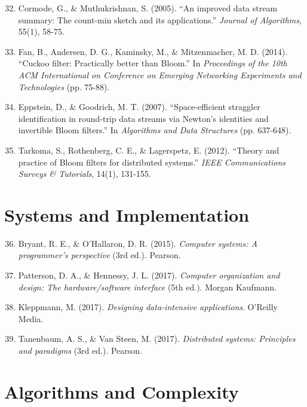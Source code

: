 \begin{enumerate}
\setcounter{enumi}{31}
\item Cormode, G., \& Muthukrishnan, S. (2005). ``An improved data stream summary: The count-min sketch and its applications.'' \textit{Journal of Algorithms}, 55(1), 58-75.

\item Fan, B., Andersen, D. G., Kaminsky, M., \& Mitzenmacher, M. D. (2014). ``Cuckoo filter: Practically better than Bloom.'' In \textit{Proceedings of the 10th ACM International on Conference on Emerging Networking Experiments and Technologies} (pp. 75-88).

\item Eppstein, D., \& Goodrich, M. T. (2007). ``Space-efficient straggler identification in round-trip data streams via Newton's identities and invertible Bloom filters.'' In \textit{Algorithms and Data Structures} (pp. 637-648).

\item Tarkoma, S., Rothenberg, C. E., \& Lagerspetz, E. (2012). ``Theory and practice of Bloom filters for distributed systems.'' \textit{IEEE Communications Surveys \& Tutorials}, 14(1), 131-155.
\end{enumerate}

\section*{Systems and Implementation}

\begin{enumerate}
\setcounter{enumi}{35}
\item Bryant, R. E., \& O'Hallaron, D. R. (2015). \textit{Computer systems: A programmer's perspective} (3rd ed.). Pearson.

\item Patterson, D. A., \& Hennessy, J. L. (2017). \textit{Computer organization and design: The hardware/software interface} (5th ed.). Morgan Kaufmann.

\item Kleppmann, M. (2017). \textit{Designing data-intensive applications}. O'Reilly Media.

\item Tanenbaum, A. S., \& Van Steen, M. (2017). \textit{Distributed systems: Principles and paradigms} (3rd ed.). Pearson.
\end{enumerate}

\section*{Algorithms and Complexity}


